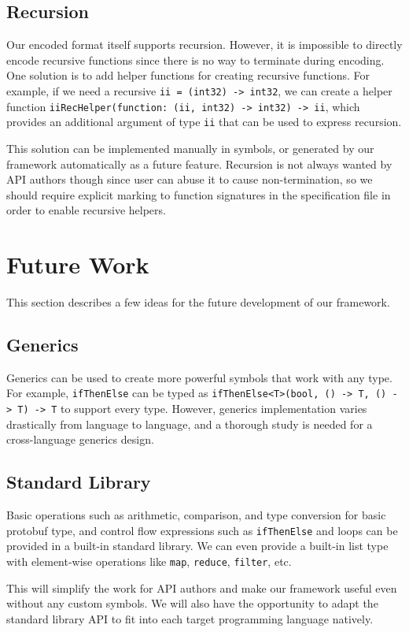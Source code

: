 \documentclass[12pt]{article}
\begin{document}
\subsection{Recursion}
Our encoded format itself supports recursion. However, it is impossible to directly encode recursive functions since there is no way to terminate during encoding. One solution is to add helper functions for creating recursive functions. For example, if we need a recursive \texttt{ii = (int32) -> int32}, we can create a helper function \texttt{iiRecHelper(function: (ii, int32) -> int32) -> ii}, which provides an additional argument of type \texttt{ii} that can be used to express recursion.

This solution can be implemented manually in symbols, or generated by our framework automatically as a future feature. Recursion is not always wanted by API authors though since user can abuse it to cause non-termination, so we should require explicit marking to function signatures in the specification file in order to enable recursive helpers.

\section{Future Work}
This section describes a few ideas for the future development of our framework.

\subsection{Generics}
Generics can be used to create more powerful symbols that work with any type. For example, \texttt{ifThenElse} can be typed as \texttt{ifThenElse<T>(bool, () -> T, () -> T) -> T} to support every type. However, generics implementation varies drastically from language to language, and a thorough study is needed for a cross-language generics design.

\subsection{Standard Library}
Basic operations such as arithmetic, comparison, and type conversion for basic protobuf type, and control flow expressions such as \texttt{ifThenElse} and loops can be provided in a built-in standard library. We can even provide a built-in list type with element-wise operations like \texttt{map}, \texttt{reduce}, \texttt{filter}, etc.

This will simplify the work for API authors and make our framework useful even without any custom symbols. We will also have the opportunity to adapt the standard library API to fit into each target programming language natively.
\end{document}

